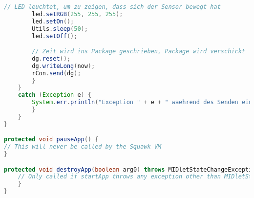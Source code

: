 \begin{lstlisting}[language=Java,caption={Code MovementDetection.java},nolol=true,label=lst:hoststudi,frame=single]
		// LED leuchtet, um zu zeigen, dass sich der Sensor bewegt hat
		led.setRGB(255, 255, 255);
		led.setOn();
		Utils.sleep(50);
		led.setOff();

		// Zeit wird ins Package geschrieben, Package wird verschickt
		dg.reset();
		dg.writeLong(now);
		rCon.send(dg);
		}
	} 
	catch (Exception e) {
		System.err.println("Exception " + e + " waehrend des Senden eines Paketes.");
		}
	}
}

protected void pauseApp() {
// This will never be called by the Squawk VM
}

protected void destroyApp(boolean arg0) throws MIDletStateChangeException {
	// Only called if startApp throws any exception other than MIDletStateChangeException
	}
}
\end{lstlisting}

